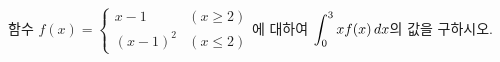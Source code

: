 함수 $f(x)=\begin{cases} x-1 & (x\ge 2) \\ (x-1)^2 & (x\le 2) \end{cases}$에 대하여 $\displaystyle\int_{0}^{3} xf(x)\mkern3mu dx$의 값을 구하시오.
